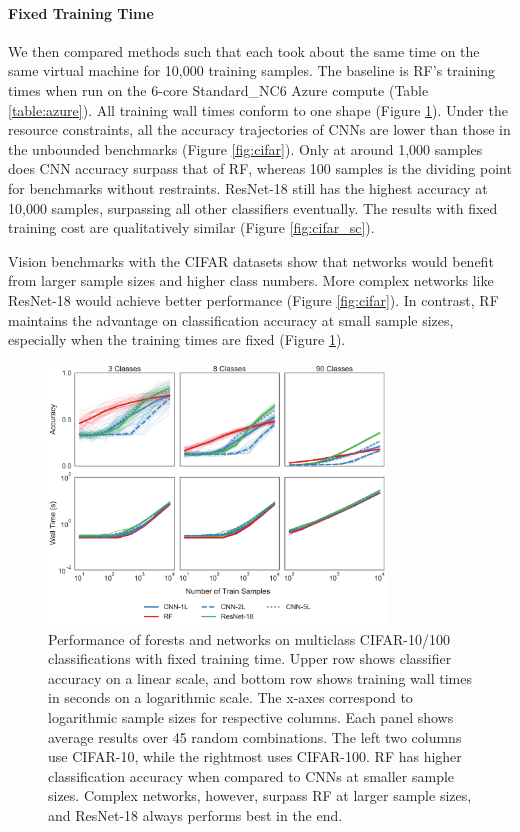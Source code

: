 \paragraph{Fixed Training Time}
We then compared methods such that each took about the same time on the same virtual machine for 10,000 training samples. The baseline is RF's training times when run on the 6-core Standard\_NC6 Azure compute (Table \ref{table:azure}).
All training wall times conform to one shape (Figure \ref{fig:cifar_st}). Under the resource constraints, all the accuracy trajectories of CNNs are lower than those in the unbounded benchmarks (Figure \ref{fig:cifar}). Only at around 1,000 samples does CNN accuracy surpass that of RF, whereas 100 samples is the dividing point for benchmarks without restraints. ResNet-18 still has the highest accuracy at 10,000 samples, surpassing all other classifiers eventually. The results with fixed training cost are qualitatively similar (Figure \ref{fig:cifar_sc}).

Vision benchmarks with the CIFAR datasets show that networks would benefit from larger sample sizes and higher class numbers. More complex networks like ResNet-18 would achieve better performance (Figure \ref{fig:cifar}). In contrast, RF maintains the advantage on classification accuracy at small sample sizes, especially when the training times are fixed (Figure \ref{fig:cifar_st}). 

\begin{figure}[htb]
\centering
\includegraphics[width=0.8\textwidth]{figures/cifar_st}
  \caption{Performance of forests and networks on multiclass CIFAR-10/100 classifications with fixed training time.
  Upper row shows classifier accuracy on a linear scale, and bottom row shows training wall times in seconds on a logarithmic scale. The x-axes correspond to logarithmic sample sizes for respective columns. Each panel shows average results over 45 random combinations. The left two columns use CIFAR-10, while the rightmost uses CIFAR-100.
  RF has higher classification accuracy when compared to CNNs at smaller sample sizes. Complex networks, however, surpass RF at larger sample sizes, and ResNet-18 always performs best in the end.
  }
\label{fig:cifar_st}
\end{figure}

